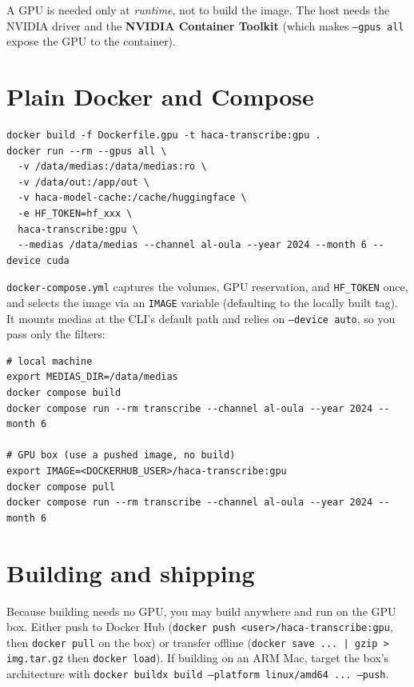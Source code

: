 \documentclass[11pt,a4paper]{report}
\newcommand{\code}[1]{\texttt{\small #1}}
\begin{document}
A GPU is needed only at \emph{runtime}, not to build the image. The host needs the
NVIDIA driver and the \textbf{NVIDIA Container Toolkit} (which makes
\code{--gpus all} expose the GPU to the container).

\section{Plain Docker and Compose}

\begin{lstlisting}[style=sh,numbers=none,caption={Build and run with plain Docker.}]
docker build -f Dockerfile.gpu -t haca-transcribe:gpu .
docker run --rm --gpus all \
  -v /data/medias:/data/medias:ro \
  -v /data/out:/app/out \
  -v haca-model-cache:/cache/huggingface \
  -e HF_TOKEN=hf_xxx \
  haca-transcribe:gpu \
  --medias /data/medias --channel al-oula --year 2024 --month 6 --device cuda
\end{lstlisting}

\code{docker-compose.yml} captures the volumes, GPU reservation, and \code{HF\_TOKEN}
once, and selects the image via an \code{IMAGE} variable (defaulting to the locally
built tag). It mounts medias at the CLI's default path and relies on
\code{--device auto}, so you pass only the filters:

\begin{lstlisting}[style=sh,numbers=none,caption={Compose: local build vs.\ Docker Hub pull.}]
# local machine
export MEDIAS_DIR=/data/medias
docker compose build
docker compose run --rm transcribe --channel al-oula --year 2024 --month 6

# GPU box (use a pushed image, no build)
export IMAGE=<DOCKERHUB_USER>/haca-transcribe:gpu
docker compose pull
docker compose run --rm transcribe --channel al-oula --year 2024 --month 6
\end{lstlisting}

\section{Building and shipping}

Because building needs no GPU, you may build anywhere and run on the GPU box.
Either push to Docker Hub (\code{docker push <user>/haca-transcribe:gpu}, then
\code{docker pull} on the box) or transfer offline
(\code{docker save ... | gzip > img.tar.gz} then \code{docker load}). If building
on an ARM Mac, target the box's architecture with
\code{docker buildx build --platform linux/amd64 ... --push}.
\end{document}
